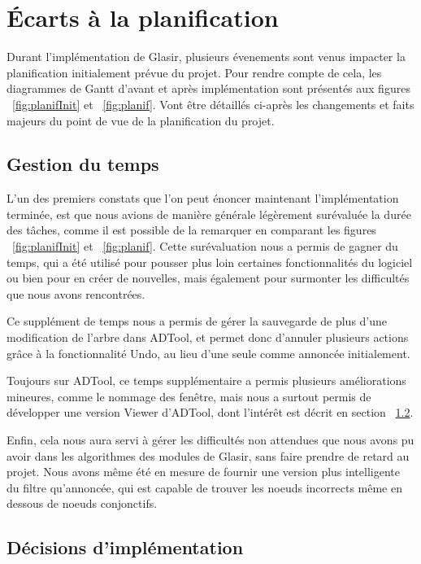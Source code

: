 \section{Écarts à la planification}
\label{sec:ecarts}

Durant l'implémentation de Glasir, plusieurs évenements sont venus impacter la planification initialement prévue du projet. Pour rendre compte de cela, les diagrammes de Gantt d'avant et après implémentation sont présentés aux figures ~\ref{fig:planifInit} et  ~\ref{fig:planif}. Vont être détaillés ci-après les changements et faits majeurs du point de vue de la planification du projet. 

\subsection{Gestion du temps}

L'un des premiers constats que l'on peut énoncer maintenant l'implémentation terminée, est que nous avions de manière générale légèrement surévaluée la durée des tâches, comme il est possible de la remarquer en comparant les figures ~\ref{fig:planifInit} et  ~\ref{fig:planif}. Cette surévaluation nous a permis de gagner du temps, qui a été utilisé pour pousser plus loin certaines fonctionnalités du logiciel ou bien pour en créer de nouvelles, mais également pour surmonter les difficultés que nous avons rencontrées.

Ce supplément de temps nous a permis de gérer la sauvegarde de plus d'une modification de l'arbre dans ADTool, et permet donc d'annuler plusieurs actions grâce à la fonctionnalité Undo, au lieu d'une seule comme annoncée initialement.

Toujours sur ADTool, ce temps supplémentaire a permis plusieurs améliorations mineures, comme le nommage des fenêtre, mais nous a surtout permis de développer une version \og Viewer \fg d'ADTool, dont l'intérêt est décrit en section ~\ref{sec:decisions}.

Enfin, cela nous aura servi à gérer les difficultés non attendues que nous avons pu avoir dans les algorithmes des modules de Glasir, sans faire prendre de retard au projet. Nous avons même été en mesure de fournir une version plus intelligente du filtre qu'annoncée, qui est capable de trouver les noeuds incorrects même en dessous de noeuds conjonctifs.  

\subsection{Décisions d'implémentation}
\label{sec:decisions}

